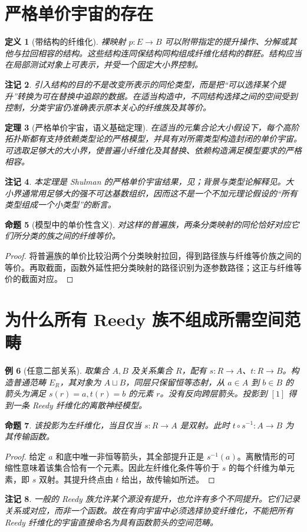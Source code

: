 \documentclass[12pt,oneside,openany,fontset=none]{ctexbook}
\theoremstyle{cn}
\newtheorem{definition}{定义}[chapter]
\newtheorem{example}[definition]{例}
\newtheorem{proposition}[definition]{命题}
\newtheorem{theorem}[definition]{定理}
\newtheorem{remark}[definition]{注记}
\numberwithin{equation}{chapter}
\begin{document}
\section{严格单价宇宙的存在}
\begin{definition}[带结构的纤维化]
裸映射 $p:E\to B$ 可以附带指定的提升操作、分解或其他与拉回相容的结构。这些结构连同保结构同构组成纤维化结构的群胚。结构应当在局部测试对象上可表示，并受一个固定大小界控制。
\end{definition}
\begin{remark}
引入结构的目的不是改变所表示的同伦类型，而是把“可以选择某个提升”转换为可在替换中追踪的数据。在适当构造中，不同结构选择之间的空间受到控制，分类宇宙仍准确表示原本关心的纤维族及其等价。
\end{remark}
\begin{theorem}[严格单价宇宙，语义基础定理]
在适当的元集合论大小假设下，每个高阶拓扑斯都有支持依赖类型论的严格模型，并具有对所需类型构造封闭的单价宇宙。可选取足够大的大小界，使普遍小纤维化及其替换、依赖构造满足模型要求的严格相容。
\end{theorem}
\begin{remark}
本定理是 Shulman 的严格单价宇宙结果，见\cite{ShulmanUniverses}；背景与类型论解释见\cite{RiehlSemantics}。大小界通常用足够大的强不可达基数组织，因而这不是一个不加元理论假设的“所有类型组成一个小类型”的断言。
\end{remark}
\begin{proposition}[模型中的单价性含义]
对这样的普遍族，两条分类映射的同伦恰好对应它们所分类的族之间的纤维等价。
\end{proposition}
\begin{proof}
将普遍族的单价比较沿两个分类映射拉回，得到路径族与纤维等价族之间的等价。再取截面，函数外延性把分类映射的路径识别为逐参数路径；这正与纤维等价的截面对应。
\end{proof}

\section{为什么所有 Reedy 族不组成所需空间范畴}
\begin{example}[任意二部关系]
取集合 $A,B$ 及关系集合 $R$，配有 $s:R\to A$、$t:R\to B$。构造普通范畴 $E_R$，其对象为 $A\sqcup B$，同层只保留恒等态射，从 $a\in A$ 到 $b\in B$ 的箭头为满足 $s(r)=a,t(r)=b$ 的元素 $r$。没有反向跨层箭头。投影到 $[1]$ 得到一条 Reedy 纤维化的离散神经模型。
\end{example}
\begin{proposition}
该投影为左纤维化，当且仅当 $s:R\to A$ 是双射。此时 $t\circ s^{-1}:A\to B$ 为其传输函数。
\end{proposition}
\begin{proof}
给定 $a$ 和底中唯一非恒等箭头，其全部提升正是 $s^{-1}(a)$。离散情形的可缩性意味着该集合恰有一个元素。因此左纤维化条件等价于 $s$ 的每个纤维为单元素，即 $s$ 双射。其提升终点由 $t$ 给出，故传输如所述。
\end{proof}
\begin{remark}
一般的 Reedy 族允许某个源没有提升，也允许有多个不同提升。它们记录关系或对应，而非一个函数。故在有向宇宙中必须选择协变纤维化，不能把所有 Reedy 纤维化的宇宙直接命名为具有函数箭头的空间范畴。
\end{remark}
\end{document}
